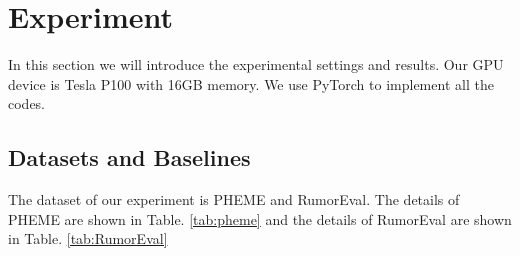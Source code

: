 \section{Experiment}
\label{sec:experiment}
In this section we will introduce the experimental settings and results. Our GPU device is Tesla P100 with 16GB memory. We use PyTorch to implement all the codes.

\subsection{Datasets and Baselines}
\label{sec:dataset}
The dataset of our experiment is  PHEME \cite{DBLP:conf/coling/KochkinaLZ18} and RumorEval\cite{DBLP:conf/semeval/EnayetE17}. The details of PHEME are shown in Table. \ref{tab:pheme} and the details of RumorEval are shown in Table. \ref{tab:RumorEval}

\begin{table}[htbp]
	\caption{PHEME}
	\centering
	\label{tab:pheme}
\end{table}

\begin{table}[tbp]
	\caption{RumorEval}
	\centering
	\label{tab:RumorEval}
\end{table}

